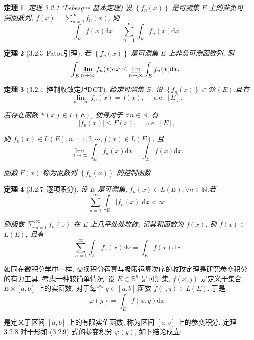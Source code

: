 \documentclass[10pt,openany]{book}
\theoremstyle{thmstyle} %
\newtheorem{theorem}{定理}[chapter]
\theoremstyle{defstyle} %
\theoremstyle{prostyle} %
\begin{document}
\begin{theorem}
定理 3.2.1 (Lebesgue 基本定理) 设 $\left\{f_n(x)\right\}$ 是可测集 $E$ 上的非负可测函数列, $f(x)=\sum_{n=1}^{\infty} f_n(x)$, 则
$$
\int_E f(x) \mathrm{d} x=\sum_{n=1}^{\infty} \int_E f_n(x) \mathrm{d} x .
$$
\end{theorem}

\begin{theorem}[3.2.3~Fatou引理]
若 $\left\{f_n(x)\right\}$ 是可测集 $E$ 上非负可测函数列, 则
$$
\int_E \varliminf_{n \rightarrow \infty} f_n(x) \mathrm{d} x \leq \varliminf_{n \rightarrow \infty} \int_E f_n(x) \mathrm{d} x \text {. }
$$
\end{theorem}

\begin{theorem}[3.2.4~控制收敛定理DCT]
给定可测集 $E$. 设 $\left\{f_n(x)\right\} \subset \mathfrak{M}(E)$,且有
$$
\lim _{n \rightarrow \infty} f_n(x)=f(x), \quad \text { a.e. }[E] .
$$

若存在函数 $F(x) \in L(E)$, 使得对于 $\forall n \in \mathbb{N}$, 有
$$
\left|f_n(x)\right| \leq F(x), \quad \text { a.e. }[E],
$$

则 $f_n(x) \in L(E), n=1,2, \cdots, f(x) \in L(E)$, 且
$$
\lim _{n \rightarrow \infty} \int_E f_n(x) \mathrm{d} x=\int_E f(x) \mathrm{d} x .
$$

函数 $F(x)$ 称为函数列 $\left\{f_n(x)\right\}$ 的控制函数.
\end{theorem}

\begin{theorem}[3.2.7~逐项积分]
设 $E$ 是可测集, $f_n(x) \in L(E), \forall n \in \mathbb{N}$.若
$$
\sum_{n=1}^{\infty} \int_E\left|f_n(x)\right| \mathrm{d} x<\infty
$$

则级数 $\sum_{n=1}^{\infty} f_n(x)$ 在 $E$ 上几乎处处收敛; 记其和函数为 $f(x)$, 则 $f(x) \in$ $L(E)$, 且有
$$
\sum_{n=1}^{\infty} \int_E f_n(x) \mathrm{d} x=\int_E f(x) \mathrm{d} x
$$
\end{theorem}




如同在微积分学中一样, 交换积分运算与极限运算次序的收玫定理是研究参变积分的有力工具. 考虑一种较简单情况. 设 $E \subset \mathbb{R}^n$ 是可测集, $f(x, y)$ 是定义于集合 $E \times[a, b]$ 上的实函数. 对于每个 $y \in[a, b]$,函数 $f(\cdot, y) \in L(E)$. 于是
$$
\varphi(y)=\int_E f(x, y) \mathrm{d} x
$$

是定义于区间 $[a, b]$ 上的有限实值函数, 称为区间 $[a, b]$ 上的参变积分.
定理 3.2.8 对于形如 (3.2.9) 式的参变积分 $\varphi(y)$, 如下结论成立:
\end{document}
